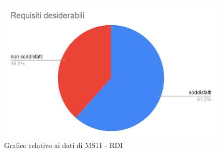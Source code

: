 \begin{figure}[H]
\centering
\includegraphics[scale=0.5]{./img/MG03.png}
\caption{Grafico relativo ai dati di MS11 - RDI}
\end{figure}

